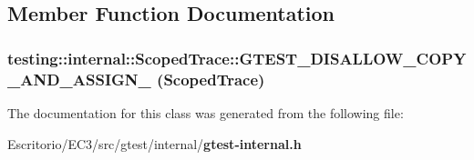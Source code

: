 \subsection{Member Function Documentation}
\subsubsection{\setlength{\rightskip}{0pt plus 5cm}testing::internal::ScopedTrace::GTEST\_\-DISALLOW\_\-COPY\_\-AND\_\-ASSIGN\_\- ({\bf ScopedTrace})\hspace{0.3cm}{\tt  [private]}}\label{classtesting_1_1internal_1_1ScopedTrace_643f12ea36e5f3a7a4c29371b876f9c2}




The documentation for this class was generated from the following file:\begin{CompactItemize}
\item 
Escritorio/EC3/src/gtest/internal/{\bf gtest-internal.h}\end{CompactItemize}
